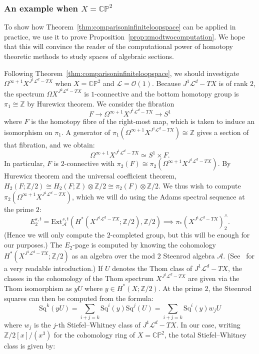 \documentclass[a4paper]{amsart}
\newcommand{\bZ}{\mathbb Z}
\newcommand{\bC}{\mathbb C}
\newcommand{\bP}{\mathbb P}
\newcommand{\cA}{\mathcal A}
\newcommand{\cL}{\mathcal L}
\newcommand{\cO}{\mathcal O}
\newcommand{\lra}{\longrightarrow}
\newcommand{\Sq}{\mathrm{Sq}}
\theoremstyle{plain}
\theoremstyle{definition}
\begin{document}
\subsubsection{An example when $X = \bC\bP^2$}

To show how Theorem~\ref{thm:comparisoninfiniteloopspace} can be applied in practice, we use it to prove Proposition~\ref{prop:zmodtwocomputation}. We hope that this will convince the reader of the computational power of homotopy theoretic methods to study spaces of algebraic sections. 

Following Theorem~\ref{thm:comparisoninfiniteloopspace}, we should investigate $\Omega^{\infty+1} X^{J^1\cL^d - TX}$ when $X = \bC\bP^2$ and $\cL = \cO(1)$. Because $J^1\cL^d - TX$ is of rank $2$, the spectrum $\Omega X^{J^2\cL^d - TX}$ is $1$-connective and the bottom homotopy group is $\pi_1 \cong \bZ$ by Hurewicz theorem. We consider the fibration
\[
    F \lra \Omega^{\infty+1} X^{J^1\cL^d - TX} \lra S^1
\]
where $F$ is the homotopy fibre of the right-most map, which is taken to induce an isomorphism on $\pi_1$. A generator of $\pi_1(\Omega^{\infty+1} X^{J^1\cL^d - TX}) \cong \bZ$ gives a section of that fibration, and we obtain:
\[
    \Omega^{\infty+1} X^{J^1\cL^d - TX} \simeq S^1 \times F.
\]
In particular, $F$ is $2$-connective with $\pi_2(F) \cong \pi_2(\Omega^{\infty+1} X^{J^1\cL^d - TX})$. By Hurewicz theorem and the universal coefficient theorem, $H_2(F;\bZ/2) \cong H_2(F;\bZ) \otimes \bZ/2 \cong \pi_2(F) \otimes \bZ/2$. We thus wish to compute $\pi_2(\Omega^{\infty+1} X^{J^1\cL^d - TX})$, which we will do using the Adams spectral sequence at the prime $2$:
\[
    E^{s,t}_2 = \mathrm{Ext}^{s,t}_{\cA}\left(H^*(X^{J^1\cL^d - TX}; \bZ/2), \bZ/2\right) \implies \pi_*(X^{J^1\cL^d - TX})^\wedge_2.
\]
(Hence we will only compute the $2$-completed group, but this will be enough for our purposes.) The $E_2$-page is computed by knowing the cohomology $H^*(X^{J^1\cL^d - TX}; \bZ/2)$ as an algebra over the mod $2$ Steenrod algebra $\cA$. (See~\cite[Section 3.3]{beaudry_guide_2018} for a very readable introduction.) If $U$ denotes the Thom class of $J^1\cL^d - TX$, the classes in the cohomology of the Thom spectrum $X^{J^1\cL^d - TX}$ are given via the Thom isomorphism as $yU$ where $y \in H^*(X; \bZ/2)$. At the prime $2$, the Steenrod squares can then be computed from the formula:
\[
    \Sq^k(yU) = \sum_{i+j = k} \Sq^i(y) \Sq^j(U) = \sum_{i+j = k} \Sq^i(y) w_j U
\]
where $w_j$ is the $j$-th Stiefel--Whitney class of $J^1\cL^d - TX$. In our case, writing $\bZ/2[x]/(x^3)$ for the cohomology ring of $X = \bC\bP^2$, the total Stiefel--Whitney class is given by:
\end{document}

